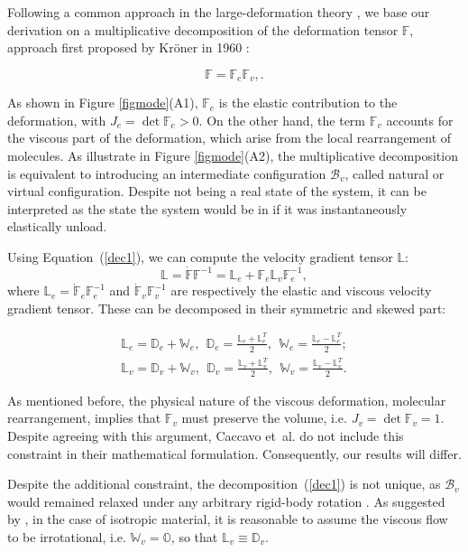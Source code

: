 \documentclass[runningheads]{llncs}
\newcommand{\F}{\ensuremath{\mathbb{F}}}
\newcommand{\LL}{\ensuremath{\mathbb{L}}}
\begin{document}
Following a common approach in the large-deformation theory \cite{Article1,CACCAVO2,Plasto,magneto,NGUYEN,growthtum}, we base our derivation on a multiplicative decomposition of the deformation tensor $\F$, approach first proposed by Kr\"{o}ner in 1960 \cite{kro}:

\begin{equation}
\F=\F_e\F_v,\label{dec1}.
\end{equation}

As shown in Figure \ref{figmode}(A1), $\F_e$ is the elastic contribution to the deformation, with $J_e=\det \F_e>0$. On the other hand, the term $\F_v$ accounts for the viscous part of the deformation, which arise from the local rearrangement of molecules. As illustrate in Figure \ref{figmode}(A2), the multiplicative decomposition is equivalent to introducing an intermediate configuration $\mathcal{B}_v$, called natural or virtual configuration. Despite not being a real state of the system, it can be interpreted as the state the system would be in if it was instantaneously elastically unload. 

Using Equation~(\ref{dec1}), we can compute the velocity gradient tensor $\LL$:
\begin{equation}
\LL = \dot{\F}\F^{-1} = \LL_e + \F_e \LL_v \F_e^{-1},
\end{equation}
where $\LL_e=\dot{\F}_e\F_e^{-1}$ and $\dot{\F}_v\F_v^{-1}$ are respectively the elastic and viscous velocity gradient tensor. These can be decomposed in their symmetric and skewed part:

\begin{equation}
\begin{aligned}
\LL_e = \mathbb{D}_e + \mathbb{W}_e, \ \ \mathbb{D}_e = \frac{\LL_e+\LL^T_e}{2}, \ \ \mathbb{W}_e = \frac{\LL_e-\LL^T_e}{2};\\
\LL_v = \mathbb{D}_v + \mathbb{W}_v,  \ \ \mathbb{D}_v = \frac{\LL_v+\LL^T_v}{2}, \ \ \mathbb{W}_v = \frac{\LL_v-\LL^T_v}{2}.
\end{aligned}
\end{equation}

As mentioned before, the physical nature of the viscous deformation, molecular rearrangement, implies that $\F_v$ must preserve the volume, i.e. $J_v=\det \F_v= 1$. Despite agreeing with this argument, Caccavo et~al. \cite{Article1,CACCAVO2} do not include this constraint in their mathematical formulation. Consequently, our results will differ.

Despite the additional constraint, the decomposition~(\ref{dec1}) is not unique, as $\mathcal{B}_v$ would remained relaxed under any arbitrary rigid-body rotation \cite{multdec}. As suggested by \cite{Plasto}, in the case of isotropic material, it is reasonable to assume the viscous flow to be irrotational, i.e. $\mathbb{W}_v=\mathbb{O}$, so that $\LL_v \equiv \mathbb{D}_v$.
 
\end{document}

